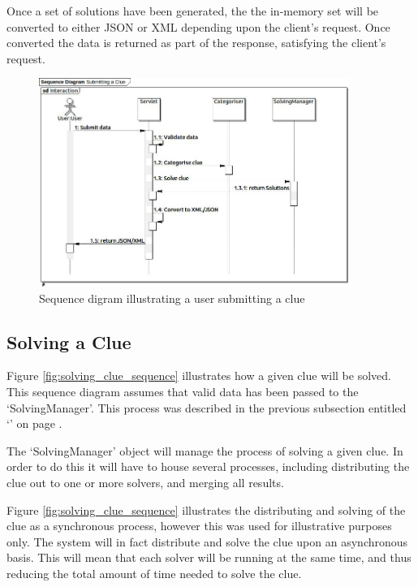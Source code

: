 Once a set of solutions have been generated, the the in-memory set will be 
converted to either JSON or XML depending upon the client's request. Once 
converted the data is returned as part of the response, satisfying the client's
request.

\begin{figure}[H]
  \centering
  \includegraphics[width=0.9\textwidth]{sequence/submitting_a_clue.jpg}
  \caption{Sequence digram illustrating a user submitting a clue}
  \label{fig:submit_clue_sequence}
\end{figure}


\subsection{Solving a Clue}
\label{sub:solving_a_clue}

Figure \ref{fig:solving_clue_sequence} illustrates how a given clue will be 
solved. This sequence diagram assumes that valid data has been passed to the 
`SolvingManager'. This process was described in the previous subsection entitled
`' on page \pageref{sub:submitting_a_clue}.

The `SolvingManager' object will manage the process of solving a given clue. In 
order to do this it will have to house several processes, including distributing
the clue out to one or more solvers, and merging all results.

Figure \ref{fig:solving_clue_sequence} illustrates the distributing and solving
of the clue as a synchronous process, however this was used for illustrative
purposes only. The system will in fact distribute and solve the clue upon an
asynchronous basis. This will mean that each solver will be running at the same 
time, and thus reducing the total amount of time needed to solve the clue.

